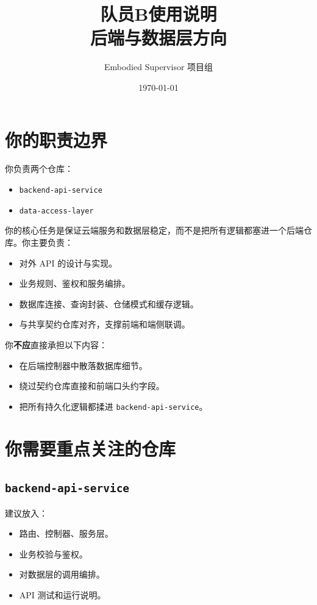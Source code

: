 \documentclass[11pt,a4paper]{ctexart}
\title{队员B使用说明\\后端与数据层方向}
\author{Embodied Supervisor 项目组}
\date{\today}
\begin{document}
\maketitle

\section{你的职责边界}

你负责两个仓库：

\begin{itemize}
  \item \texttt{backend-api-service}
  \item \texttt{data-access-layer}
\end{itemize}

你的核心任务是保证云端服务和数据层稳定，而不是把所有逻辑都塞进一个后端仓库。你主要负责：

\begin{itemize}
  \item 对外 API 的设计与实现。
  \item 业务规则、鉴权和服务编排。
  \item 数据库连接、查询封装、仓储模式和缓存逻辑。
  \item 与共享契约仓库对齐，支撑前端和端侧联调。
\end{itemize}

你\textbf{不应}直接承担以下内容：

\begin{itemize}
  \item 在后端控制器中散落数据库细节。
  \item 绕过契约仓库直接和前端口头约字段。
  \item 把所有持久化逻辑都揉进 \texttt{backend-api-service}。
\end{itemize}

\section{你需要重点关注的仓库}

\subsection{\texttt{backend-api-service}}

建议放入：

\begin{itemize}
  \item 路由、控制器、服务层。
  \item 业务校验与鉴权。
  \item 对数据层的调用编排。
  \item API 测试和运行说明。
\end{itemize}
\end{document}
